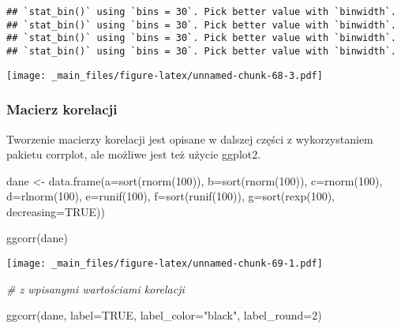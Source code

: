 \documentclass[
]{book}
\newenvironment{Shaded}{\begin{snugshade}}{\end{snugshade}}
\newcommand{\AttributeTok}[1]{\textcolor[rgb]{0.77,0.63,0.00}{#1}}
\newcommand{\CommentTok}[1]{\textcolor[rgb]{0.56,0.35,0.01}{\textit{#1}}}
\newcommand{\ConstantTok}[1]{\textcolor[rgb]{0.00,0.00,0.00}{#1}}
\newcommand{\DecValTok}[1]{\textcolor[rgb]{0.00,0.00,0.81}{#1}}
\newcommand{\FunctionTok}[1]{\textcolor[rgb]{0.00,0.00,0.00}{#1}}
\newcommand{\NormalTok}[1]{#1}
\newcommand{\OtherTok}[1]{\textcolor[rgb]{0.56,0.35,0.01}{#1}}
\newcommand{\StringTok}[1]{\textcolor[rgb]{0.31,0.60,0.02}{#1}}
\begin{document}
\begin{verbatim}
## `stat_bin()` using `bins = 30`. Pick better value with `binwidth`.
## `stat_bin()` using `bins = 30`. Pick better value with `binwidth`.
## `stat_bin()` using `bins = 30`. Pick better value with `binwidth`.
## `stat_bin()` using `bins = 30`. Pick better value with `binwidth`.
\end{verbatim}

\texttt{[image: \_main\_files/figure-latex/unnamed-chunk-68-3.pdf]}

\hypertarget{macierz-korelacji}{%
\subsubsection{Macierz korelacji}\label{macierz-korelacji}}

Tworzenie macierzy korelacji jest opisane w dalszej części z wykorzystaniem pakietu corrplot, ale możliwe jest też użycie ggplot2.

\begin{Shaded}
\begin{Highlighting}[]
\NormalTok{dane }\OtherTok{\textless{}{-}} \FunctionTok{data.frame}\NormalTok{(}\AttributeTok{a=}\FunctionTok{sort}\NormalTok{(}\FunctionTok{rnorm}\NormalTok{(}\DecValTok{100}\NormalTok{)), }\AttributeTok{b=}\FunctionTok{sort}\NormalTok{(}\FunctionTok{rnorm}\NormalTok{(}\DecValTok{100}\NormalTok{)), }\AttributeTok{c=}\FunctionTok{rnorm}\NormalTok{(}\DecValTok{100}\NormalTok{), }\AttributeTok{d=}\FunctionTok{rlnorm}\NormalTok{(}\DecValTok{100}\NormalTok{), }\AttributeTok{e=}\FunctionTok{runif}\NormalTok{(}\DecValTok{100}\NormalTok{),}
                   \AttributeTok{f=}\FunctionTok{sort}\NormalTok{(}\FunctionTok{runif}\NormalTok{(}\DecValTok{100}\NormalTok{)), }\AttributeTok{g=}\FunctionTok{sort}\NormalTok{(}\FunctionTok{rexp}\NormalTok{(}\DecValTok{100}\NormalTok{), }\AttributeTok{decreasing=}\ConstantTok{TRUE}\NormalTok{))}

\FunctionTok{ggcorr}\NormalTok{(dane)}
\end{Highlighting}
\end{Shaded}

\texttt{[image: \_main\_files/figure-latex/unnamed-chunk-69-1.pdf]}

\begin{Shaded}
\begin{Highlighting}[]
\CommentTok{\# z wpisanymi wartościami korelacji}

\FunctionTok{ggcorr}\NormalTok{(dane, }\AttributeTok{label=}\ConstantTok{TRUE}\NormalTok{, }\AttributeTok{label\_color=}\StringTok{"black"}\NormalTok{, }\AttributeTok{label\_round=}\DecValTok{2}\NormalTok{)}
\end{Highlighting}
\end{Shaded}
\end{document}
